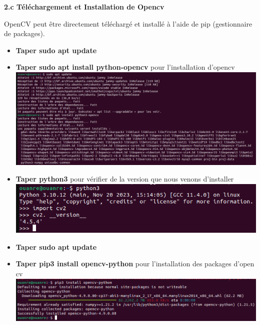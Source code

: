 \documentclass[12pt,a4paper]{article}
\begin{document}
\begin{center}
	\textbf{2.c Téléchargement et Installation de Opencv}
\end{center}
OpenCV peut être directement téléchargé et installé à l'aide de pip (gestionnaire de packages). \\
\begin{itemize}
\item \textbf{Taper sudo apt update}
\item \textbf{Taper sudo apt install python-opencv} pour l'installation d'opencv \\

\includegraphics[scale=0.36]{image/insallation opencv.png}\\

\item \textbf{Taper python3} pour vérifier de la version que nous venons d'installer \\

\includegraphics[scale=0.5]{image/verification opencv.png}\\

\item \textbf{Taper sudo apt update}
\item \textbf{Taper pip3 install opencv-python} pour l'installation des packages d'open cv\\

\includegraphics[scale=0.5]{image/package opencv.png}\\
 

\end{itemize}
\end{document}
